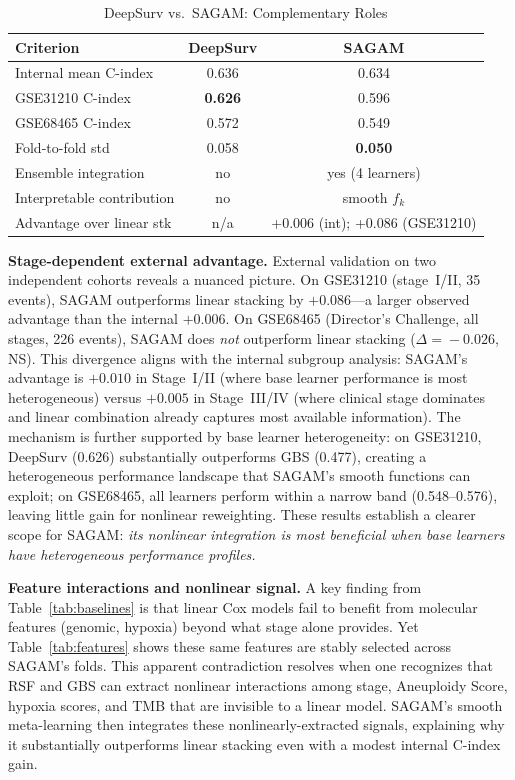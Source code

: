 \documentclass[conference]{IEEEtran}
\begin{document}
\begin{table}[t]
\caption{DeepSurv vs.\ SAGAM: Complementary Roles}
\label{tab:deepsurv_compare}
\begin{center}
\setlength\tabcolsep{3pt}
\begin{tabular}{lcc}
\toprule
\textbf{Criterion} & \textbf{DeepSurv} & \textbf{SAGAM} \\
\midrule
Internal mean C-index      & 0.636 & 0.634 \\
GSE31210 C-index           & \textbf{0.626} & 0.596 \\
GSE68465 C-index           & 0.572 & 0.549 \\
Fold-to-fold std           & 0.058 & \textbf{0.050} \\
Ensemble integration       & no    & yes (4 learners) \\
Interpretable contribution & no    & smooth $f_k$ \\
Advantage over linear stk  & n/a   & +0.006 (int); +0.086 (GSE31210) \\
\bottomrule
\end{tabular}
\end{center}
\end{table}

\textbf{Stage-dependent external advantage.}
External validation on two independent cohorts reveals a nuanced picture.
On GSE31210 (stage~I/II, 35 events), SAGAM outperforms linear stacking by
$+0.086$---a larger observed advantage than the internal $+0.006$.
On GSE68465 (Director's Challenge, all stages, 226 events), SAGAM does
\emph{not} outperform linear stacking ($\Delta\!=\!-0.026$, NS).
This divergence aligns with the internal subgroup analysis: SAGAM's
advantage is $+0.010$ in Stage~I/II (where base learner performance is most
heterogeneous) versus $+0.005$ in Stage~III/IV (where clinical stage
dominates and linear combination already captures most available information).
The mechanism is further supported by base learner heterogeneity:
on GSE31210, DeepSurv (0.626) substantially outperforms GBS (0.477),
creating a heterogeneous performance landscape that SAGAM's smooth
functions can exploit; on GSE68465, all learners perform within a
narrow band (0.548--0.576), leaving little gain for nonlinear reweighting.
These results establish a clearer scope for SAGAM: \emph{its nonlinear
integration is most beneficial when base learners have heterogeneous
performance profiles.}

\textbf{Feature interactions and nonlinear signal.}
A key finding from Table~\ref{tab:baselines} is that linear Cox models fail
to benefit from molecular features (genomic, hypoxia) beyond what stage
alone provides.
Yet Table~\ref{tab:features} shows these same features are stably selected
across SAGAM's folds.
This apparent contradiction resolves when one recognizes that RSF and GBS
can extract nonlinear interactions among stage, Aneuploidy Score, hypoxia
scores, and TMB that are invisible to a linear model.
SAGAM's smooth meta-learning then integrates these nonlinearly-extracted
signals, explaining why it substantially outperforms linear stacking even
with a modest internal C-index gain.
\end{document}
